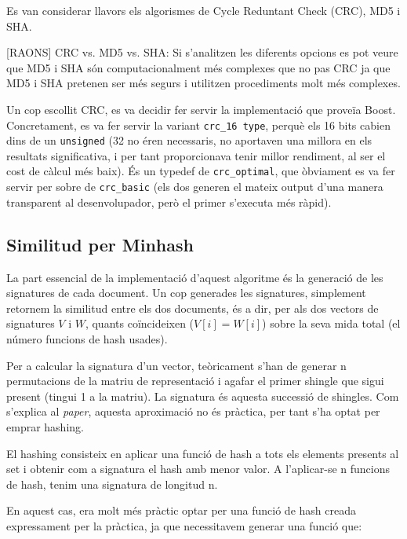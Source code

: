 \documentclass[catalan, 12pt]{report}
\begin{document}
Es van considerar llavors els algorismes de Cycle Reduntant Check (CRC), MD5 i SHA.

[RAONS] \newline
CRC vs. MD5 vs. SHA: Si s'analitzen les diferents opcions es pot veure que MD5 i SHA són computacionalment més complexes que no pas CRC ja que MD5 i SHA pretenen ser més segurs i utilitzen procediments molt més complexes. \newline

Un cop escollit CRC, es va decidir fer servir la implementació que proveïa Boost. Concretament, es va fer servir la variant \verb|crc_16 type|, perquè els 16 bits cabien dins de un \verb|unsigned| (32 no éren necessaris, no aportaven una millora en els resultats significativa, i per tant proporcionava tenir millor rendiment, al ser el cost de càlcul més baix). És un typedef de \verb|crc_optimal|, que òbviament es va fer servir per sobre de \verb|crc_basic| (els dos generen el mateix output d'una manera transparent al desenvolupador, però el primer s'executa més ràpid). 

\subsection{Similitud per Minhash}

La part essencial de la implementació d'aquest algoritme és la generació de les signatures de cada document. Un cop generades les signatures, simplement retornem la similitud entre els dos documents, és a dir, per als dos vectors de signatures \(V\) i \(W\), quants coïncideixen (\(V[i] = W[i]\)) sobre la seva mida total (el número funcions de hash usades).\newline

Per a calcular la signatura d'un vector, teòricament s'han de generar n permutacions de la matriu de representació i agafar el primer shingle que sigui present (tingui 1 a la matriu). La signatura és aquesta successió de shingles. Com s'explica al \textit{paper}, aquesta aproximació no és pràctica, per tant s'ha optat per emprar hashing.\newline

El hashing consisteix en aplicar una funció de hash a tots els elements presents al set i obtenir com a signatura el hash amb menor valor. A l'aplicar-se n funcions de hash, tenim una signatura de longitud n.\newline

En aquest cas, era molt més pràctic optar per una funció de hash creada expressament per la pràctica, ja que necessitavem generar una funció que:
\end{document}
